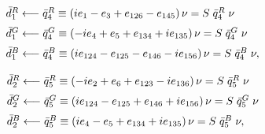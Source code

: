 \documentclass[letterpaper,12pt,titlepage,oneside,final]{book}
\newcommand{\spacer}{0.2cm}
\begin{document}
\begin{equation}\begin{array}{l}\label{newtriplet4}
\bar{d}_1^R\longleftarrow \bar{q}^R_{4}\equiv\left(ie_{1}-e_{3}+e_{126}-e_{145}\right)\nu  = S\hspace{1mm}\bar{q}^R_{4}\hspace{1mm}\nu \vspace{\spacer} \\
\bar{d}_1^G\longleftarrow \bar{q}^G_{4}\equiv\left(-ie_{4}+e_{5}+e_{134}+ie_{135}\right)\nu = S\hspace{1mm}\bar{q}^G_{4}\hspace{1mm}\nu   \vspace{\spacer} \\
\bar{d}_1^B\longleftarrow \bar{q}^B_{4}\equiv\left(ie_{124}-e_{125}-e_{146}-ie_{156}\right)\nu = S\hspace{1mm}\bar{q}^B_{4}\hspace{1mm}\nu,   \vspace{\spacer} \\
\end{array}\end{equation}
\begin{equation}\begin{array}{l}\label{newtriplet5}
\bar{d}_2^R\longleftarrow \bar{q}^R_{5}\equiv\left(-ie_{2}+e_{6}+e_{123}-ie_{136}\right)\nu =S\hspace{1mm}\bar{q}^R_{5}\hspace{1mm}\nu  \vspace{\spacer} \\
\bar{d}_2^G\longleftarrow \bar{q}^G_{5}\equiv\left(ie_{124}-e_{125}+e_{146}+ie_{156}\right)\nu =S\hspace{1mm}\bar{q}^G_{5}\hspace{1mm}\nu   \vspace{\spacer} \\
\bar{d}_2^B\longleftarrow \bar{q}^B_{5}\equiv\left(ie_{4}-e_{5}+e_{134}+ie_{135}\right)\nu=S\hspace{1mm}\bar{q}^B_{5}\hspace{1mm}\nu ,   \vspace{\spacer} \\
\end{array}\end{equation}
\end{document}
